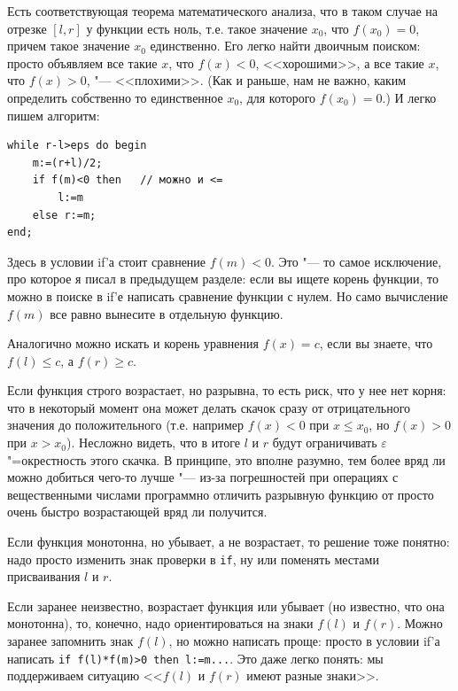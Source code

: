 \documentclass[a4paper,10pt]{problems}
\let\eps\varepsilon
\begin{document}
Есть соответствующая теорема математического анализа, что в таком случае на отрезке $[l,r]$ у функции есть ноль,
т.е. такое значение $x_0$, что $f(x_0)=0$, причем такое значение $x_0$ единственно. 
Его легко найти двоичным поиском: просто объявляем все такие $x$, что $f(x)<0$, <<хорошими>>,
а все такие $x$, что $f(x)>0$, "--- <<плохими>>. 
(Как и раньше, нам не важно, каким определить собственно то единственное $x_0$, для которого $f(x_0)=0$.)
И легко пишем алгоритм:
\begin{codesampleo}\begin{verbatim}
while r-l>eps do begin    
    m:=(r+l)/2;
    if f(m)<0 then   // можно и <=
        l:=m
    else r:=m;
end;
\end{verbatim}
\end{codesampleo}

Здесь в условии if'а стоит сравнение $f(m)<0$. 
Это "--- то самое исключение, про которое я писал в предыдущем разделе: если вы ищете корень функции, то можно в поиске в if'е написать
сравнение функции с нулем. Но само вычисление $f(m)$ все равно вынесите в отдельную функцию.

Аналогично можно искать и корень уравнения $f(x)=c$, если вы знаете, что $f(l)\leq c$, а $f(r)\geq c$.

Если функция строго возрастает, но разрывна, то есть риск, что у нее нет корня: что в некоторый момент она может делать скачок сразу от отрицательного
значения до положительного (т.е. например $f(x)<0$ при $x\leq x_0$, но $f(x)>0$ при $x>x_0$). 
Несложно видеть, что в итоге $l$ и $r$ будут ограничивать $\eps$"=окрестность этого скачка. 
В принципе, это вполне разумно, тем более вряд ли можно добиться чего-то лучше
"--- из-за погрешностей при операциях с вещественными числами программно отличить разрывную функцию от просто очень быстро возрастающей
вряд ли получится.

Если функция монотонна, но убывает, а не возрастает, то решение тоже понятно: надо просто изменить знак проверки в \verb`if`, ну или
поменять местами присваивания $l$ и $r$. 

Если заранее неизвестно, возрастает функция или убывает (но известно, что она монотонна), то, конечно, надо ориентироваться на знаки $f(l)$ и $f(r)$.
Можно заранее запомнить знак $f(l)$, но можно написать проще: просто в условии if'а написать \verb`if f(l)*f(m)>0 then l:=m...`.
Это даже легко понять: мы поддерживаем ситуацию <<$f(l)$ и $f(r)$ имеют разные знаки>>.
\end{document}
